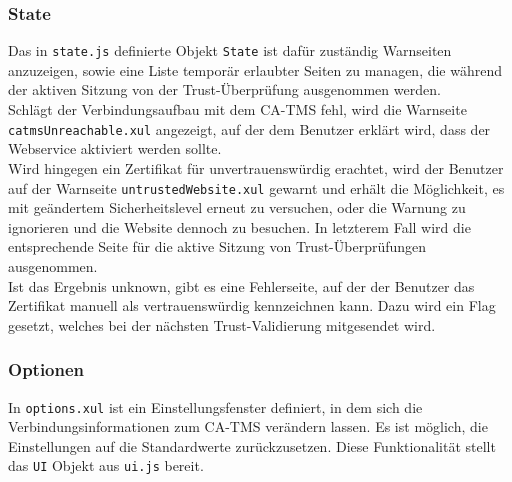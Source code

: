 \documentclass[accentcolor=tud1c,article,colorback,11pt]{tudreport}
\begin{document}
\subsubsection{State}
Das in \texttt{state.js} definierte Objekt \texttt{State} ist dafür zuständig Warnseiten anzuzeigen, sowie eine Liste temporär erlaubter Seiten zu managen, die während der aktiven Sitzung von der Trust-Überprüfung ausgenommen werden.\\
Schlägt der Verbindungsaufbau mit dem CA-TMS fehl, wird die Warnseite \texttt{catmsUnreachable.xul} angezeigt, auf der dem Benutzer erklärt wird, dass der Webservice aktiviert werden sollte.\\
Wird hingegen ein Zertifikat für unvertrauenswürdig erachtet, wird der Benutzer auf der Warnseite \texttt{untrustedWebsite.xul} gewarnt und erhält die Möglichkeit, es mit geändertem Sicherheitslevel erneut zu versuchen, oder die Warnung zu ignorieren und die Website dennoch zu besuchen. In letzterem Fall wird die entsprechende Seite für die aktive Sitzung von Trust-Überprüfungen ausgenommen.\\
Ist das Ergebnis unknown, gibt es eine Fehlerseite, auf der der Benutzer das Zertifikat manuell als vertrauenswürdig kennzeichnen kann. Dazu wird ein Flag gesetzt, welches bei der nächsten Trust-Validierung mitgesendet wird.

\subsubsection{Optionen} 
In \texttt{options.xul} ist ein Einstellungsfenster definiert, in dem sich die Verbindungsinformationen zum CA-TMS verändern lassen. Es ist möglich, die Einstellungen auf die Standardwerte zurückzusetzen. Diese Funktionalität stellt das \texttt{UI} Objekt aus \texttt{ui.js} bereit.

\newpage


\end{document}
